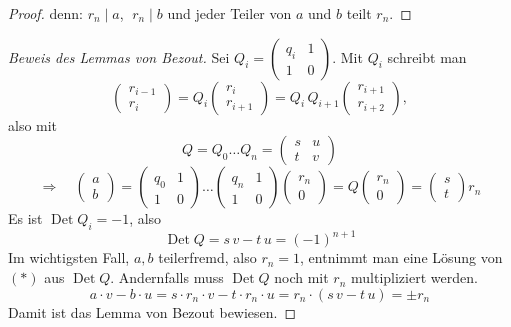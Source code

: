 \begin{proof}
denn: $r_n \mid a$, $\;r_n \mid b$ und jeder Teiler von $a$ und $b$ teilt $r_n$.
\end{proof}

\begin{proof}[Beweis des Lemmas von Bezout]
Sei $Q_i = \begin{pmatrix} q_i & 1 \\ 1 & 0 \end{pmatrix}$. Mit $Q_i$ schreibt man
\[ \begin{pmatrix} r_{i-1} \\ r_i \end{pmatrix} = Q_i \begin{pmatrix} r_i \\ r_{i+1} \end{pmatrix} = Q_i\, Q_{i+1} \begin{pmatrix} r_{i+1} \\ r_{i+2} \end{pmatrix}, \]
also mit
\[ Q = Q_0 \ldots Q_n = \begin{pmatrix} s & u \\ t & v \end{pmatrix} \]
\[ \Rightarrow \quad \begin{pmatrix} a \\ b \end{pmatrix} = \begin{pmatrix} q_0 & 1 \\ 1 & 0 \end{pmatrix} \ldots \begin{pmatrix} q_n & 1 \\ 1 & 0 \end{pmatrix} \begin{pmatrix} r_n \\ 0 \end{pmatrix} = Q \begin{pmatrix} r_n \\ 0 \end{pmatrix} = \begin{pmatrix} s \\ t \end{pmatrix} r_n \]
Es ist $\operatorname{Det} Q_i = -1$, also
\[ \operatorname{Det} Q = s\,v - t\,u = (-1)^{n+1} \]
Im wichtigsten Fall, $a, b$ teilerfremd, also $r_n = 1$, entnimmt man eine Lösung von $(*)$ aus $\operatorname{Det} Q$. Andernfalls muss $\operatorname{Det} Q$ noch mit $r_n$ multipliziert werden.
\[ a \cdot v - b \cdot u = s \cdot r_n \cdot v - t \cdot r_n \cdot u = r_n \cdot (s\,v - t\,u) = \pm r_n \]
Damit ist das Lemma von Bezout bewiesen.
\end{proof}


